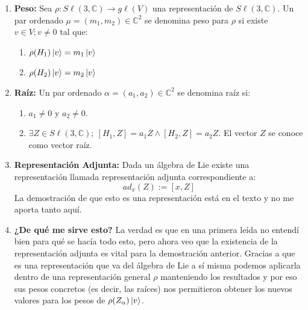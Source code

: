 \documentclass[12pt]{exam}
\begin{document}
\begin{enumerate}
  \item \textbf{Peso:} Sea $\rho : S\ell (3, \mathbb{C}) \to g\ell(V)$ una representación de $S\ell(3, \mathbb{C})$. Un par ordenado $\mu = (m_1, m_2) \in \mathbb{C}^2$ se denomina peso para $\rho$ si existe $v \in V; v \neq 0$ tal que: 
    \begin{enumerate}
      \item $\rho (H_1)\ket{v} = m_1 \ket{v}$
      \item $\rho (H_2)\ket{v} = m_2 \ket{v}$
    \end{enumerate}
  \item \textbf{Raíz:} Un par ordenado $\alpha = (a_1, a_2) \in \mathbb{C}^2$ se denomina raíz si:
    \begin{enumerate}
      \item $a_1 \neq 0$ y $a_2 \neq 0$.
      \item $\exists Z \in S\ell (3, \mathbb{C});\ [H_1, Z] = a_1 Z \land [H_2, Z] = a_2 Z$. El vector $Z$ se conoce como vector raíz.
    \end{enumerate}
  \item \textbf{Representación Adjunta:} Dada un álgebra de Lie existe una representación llamada representación adjunta correspondiente a: 
    \begin{equation}
      ad_{x} (Z) := [x, Z]
      \label{eq:rep_adjunta}
    \end{equation}
    La demostración de que esto es una representación está en el texto y no me aporta tanto aquí.
  \item \textbf{¿De qué me sirve esto?}
    La verdad es que en una primera leída no entendí bien para qué se hacía todo esto, pero ahora veo que la existencia de la representación adjunta es vital para la demostración anterior. Gracias a que es una representación que va del álgebra de Lie a sí misma podemos aplicarla dentro de una representación general $\rho$ manteniendo los resultados y por eso sus pesos concretos (es decir, las raíces) nos permitieron obtener los nuevos valores para los pesos de $\rho(Z_\alpha)\ket{v}$.
\end{enumerate}
\end{document}
